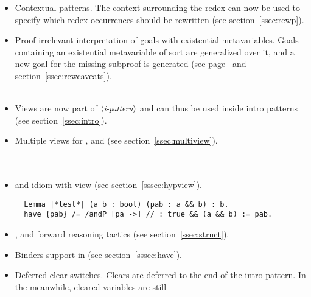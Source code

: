 \begin{itemize}
\item Contextual  patterns.
      The context surrounding the redex can now be used to specify which
      redex occurrences should be rewritten (see section~\ref{ssec:rewp}).\\
\item Proof irrelevant interpretation of goals with existential metavariables.
      Goals containing an existential metavariable of sort  are
      generalized over it, and a new goal for the missing subproof is
      generated (see page~\pageref{sssec:apply} and
      section~\ref{ssec:rewcaveats}).\\
      \\
\item Views are now part of $\langle\mbox{\itshape\rmfamily\small i-pattern}\rangle$ and can thus be used
      inside intro patterns (see section~\ref{ssec:intro}).\\
\item Multiple views for ,  and 
      (see section~\ref{ssec:multiview}).\\
      \\
      \\
\item {} and  idiom with view (see section~\ref{sssec:hypview}).
\begin{lstlisting}
  Lemma |*test*| (a b : bool) (pab : a && b) : b.
  have {pab} /= /andP [pa ->] // : true && (a && b) := pab.
\end{lstlisting}
\item {},  and  forward reasoning
      tactics (see section~\ref{ssec:struct}).\\
\item Binders support in  (see section~\ref{sssec:have}).\\
\item Deferred clear switches. Clears are deferred to the end of the
      intro pattern. In the meanwhile, cleared variables are still

\end{itemize}
